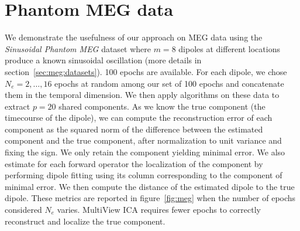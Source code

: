 \section{Phantom MEG data}
\label{sec:mvica:phantom}
We demonstrate the usefulness of our approach on MEG data using the
\emph{Sinusoidal Phantom MEG} dataset where $m=8$ dipoles at different locations
produce a known sinusoidal oscillation (more details in
section~\ref{sec:meg:datasets}). 100 epochs are available.
%
For each dipole, we chose $N_e=2, \dots, 16$ epochs at random among our set of 100 epochs and concatenate them in the temporal dimension.
%
We then apply algorithms on these data to extract $p=20$ shared components.
%
As we know the true component (the timecourse of the dipole), we can compute the reconstruction error of each component as the squared norm of the difference between the estimated component and the true component, after normalization to unit variance and fixing the sign.
%
We only retain the component yielding minimal error.
%
We also estimate for each forward operator the localization of the component by performing dipole fitting using its column corresponding to the component of minimal error.
%
We then compute the distance of the estimated dipole to the true dipole.
%
These metrics are reported in figure~\ref{fig:meg} when the number of epochs considered $N_e$ varies.
%
%
MultiView ICA requires fewer epochs to correctly reconstruct and localize the true component.
%

